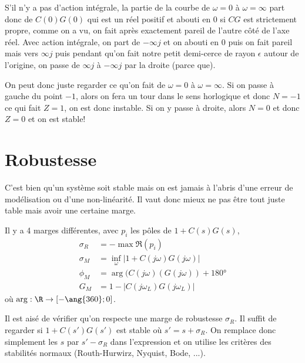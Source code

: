 S'il n'y a pas d'action intégrale, la partie de la courbe de $\omega = 0$ à $\omega = \infty$
part donc de $C(0)G(0)$ qui est un réel positif
et abouti en $0$ si $CG$ est strictement propre, comme on a vu, on fait après exactement pareil
de l'autre côté de l'axe réel.
Avec action intégrale, on part de $-\infty j$ et on abouti en $0$ puis on fait pareil
mais vers $\infty j$ puis pendant qu'on fait notre petit demi-cerce de rayon $\epsilon$ autour
de l'origine, on passe de $\infty j$ à $-\infty j$ par la droite (parce que).

On peut donc juste regarder ce qu'on fait de $\omega = 0$ à $\omega = \infty$.
Si on passe à gauche du point $-1$,
alors on fera un tour dans le sens horlogique et donc
$N = -1$ ce qui fait $Z = 1$, on est donc instable.
Si on y passe à droite, alors $N = 0$ et donc $Z = 0$ et on est stable!

\section{Robustesse}
C'est bien qu'un système soit stable mais on est jamais à l'abris d'une erreur de
modélisation ou d'une non-linéarité.
Il vaut donc mieux ne pas être tout juste table mais avoir une certaine marge.

Il y a 4 marges différentes, avec $p_i$ les pôles de $1 + C(s)G(s)$,
\begin{align*}
  \sigma_R & = -\max \Re(p_i)\\
  \sigma_M & = \inf_\omega|1 + C(j\omega)G(j\omega)|\\
  \phi_M & = \arg(C(j\omega)(G(j\omega)) + \ang{180}\\
  G_M & = 1 - |C(j\omega_L)G(j\omega_L)|
\end{align*}
où $\arg:\R\to[-\ang{360};0]$.

Il est aisé de vérifier qu'on respecte une marge de robustesse $\sigma_R$.
Il suffit de regarder si $1 + C(s')G(s')$ est stable où $s' = s + \sigma_R$.
On remplace donc simplement les $s$ par $s' - \sigma_R$ dans l'expression
et on utilise les critères des stabilités normaux
(Routh-Hurwirz, Nyquist, Bode, ...).

